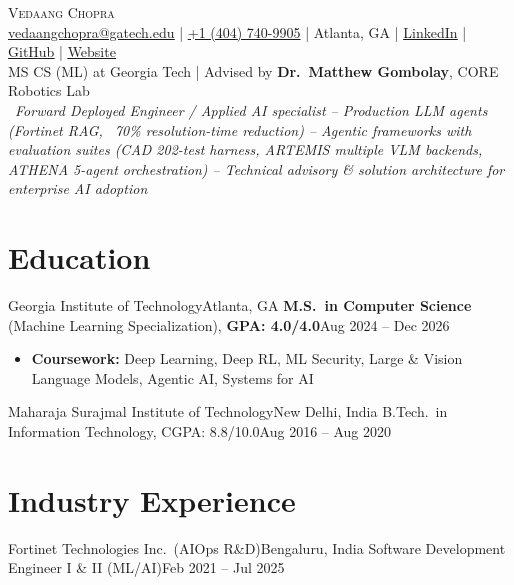 \documentclass[letterpaper,11pt]{article}
\begin{document}
\begin{center}
  {\Huge \scshape Vedaang Chopra} \\ \vspace{2pt}
  \small
  \href{mailto:vedaangchopra@gatech.edu}{\underline{vedaangchopra@gatech.edu}} \;|\;
  \underline{+1 (404) 740-9905} \;|\;
  Atlanta, GA \;|\;
  \href{https://linkedin.com/in/vedaang-chopra}{\underline{LinkedIn}} \;|\;
  \href{https://github.com/Vedaang-Chopra}{\underline{GitHub}} \;|\;
  \href{https://vedaangchopra.live/}{\underline{Website}}
  \\ \vspace{3pt}
  \small
  MS CS (ML) at Georgia Tech \;|\; Advised by \textbf{Dr.\ Matthew Gombolay}, CORE Robotics Lab \\\
  \textit{Forward Deployed Engineer / Applied AI specialist -- Production LLM agents (Fortinet RAG, ~70\% resolution-time reduction) -- Agentic frameworks with evaluation suites (CAD 202-test harness, ARTEMIS multiple VLM backends, ATHENA 5-agent orchestration) -- Technical advisory \& solution architecture for enterprise AI adoption}
\end{center}
\vspace{-6pt}

\section{Education}
\resumeSubHeadingListStart
\resumeSubheading
{Georgia Institute of Technology}{Atlanta, GA}
{\textbf{M.S.\ in Computer Science} (Machine Learning Specialization), \textbf{GPA: 4.0/4.0}}{Aug 2024 -- Dec 2026}
\vspace{-3pt}
\begin{itemize}[leftmargin=0.20in, topsep=0pt, itemsep=0pt]
  \item\footnotesize{\textbf{Coursework:} Deep Learning, Deep RL, ML Security, Large \& Vision Language Models, Agentic AI, Systems for AI}
\end{itemize}
\vspace{-6pt}
\resumeEducationCompact
{Maharaja Surajmal Institute of Technology}{New Delhi, India}
{B.Tech.\ in Information Technology, CGPA: 8.8/10.0}{Aug 2016 -- Aug 2020}
\resumeSubHeadingListEnd

\section{Industry Experience}
\resumeSubHeadingListStart
\resumeSubheading
{Fortinet Technologies Inc.\ (AIOps R\&D)}{Bengaluru, India}
{Software Development Engineer I \& II (ML/AI)}{Feb 2021 -- Jul 2025}
\resumeItemListStart
\end{document}
